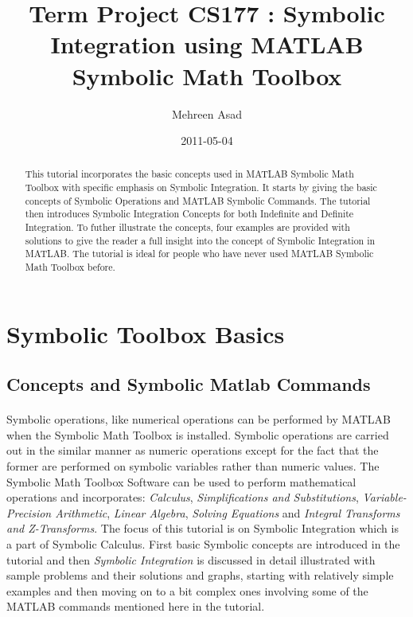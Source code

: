 \documentclass[]{article}
\title{Term Project CS177 : Symbolic Integration using MATLAB Symbolic Math Toolbox}
\author{ Mehreen Asad }
\date{2011-05-04}
\begin{document}
\ifpdf
{}
\else
{}
\fi

\maketitle


\begin{abstract}
This tutorial incorporates the basic concepts used in MATLAB Symbolic Math Toolbox with specific emphasis on Symbolic Integration. It starts by giving the basic concepts of Symbolic Operations and MATLAB Symbolic  Commands. The tutorial then introduces Symbolic Integration Concepts for both Indefinite and Definite Integration. To futher illustrate the concepts, four examples are provided with solutions to give the reader a full insight into the concept of Symbolic Integration in MATLAB. The tutorial is ideal for people who have never used MATLAB Symbolic Math Toolbox before.
\end{abstract}


\section{Symbolic Toolbox Basics}
\subsection{Concepts and Symbolic Matlab Commands}
\paragraph{}
Symbolic operations, like numerical operations can be performed by MATLAB when the Symbolic Math Toolbox is installed. Symbolic operations are carried out in the similar manner as numeric operations except for the fact that the former are performed on symbolic variables rather than numeric values. The Symbolic Math Toolbox Software can be used to perform mathematical operations and incorporates: \emph{Calculus}, \emph{Simplifications and Substitutions},   \emph{Variable-Precision Arithmetic}, \emph{Linear Algebra}, \emph{Solving Equations} and \emph{Integral Transforms and Z-Transforms}. The focus of this tutorial is on Symbolic Integration which is a part of Symbolic Calculus. First basic Symbolic concepts are introduced in the tutorial and then \emph{Symbolic Integration} is discussed in detail illustrated with sample problems and their solutions and graphs, starting with relatively simple examples and then moving on to a bit complex ones involving some of the MATLAB commands mentioned here in the tutorial.
 
\end{document}
